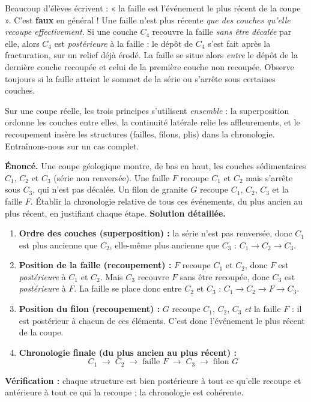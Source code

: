 \documentclass[11pt]{article}
\newcounter{popsec}
\newcounter{popsub}
\newcommand{\courssub}[1]{%
  \stepcounter{popsub}%
  \par\vspace{9pt}\noindent{\popxbold\fontsize{11.5}{13}\selectfont\color{popink}{\color{poporange}\thepopsec.\thepopsub}\hspace{6pt}#1}\par\nopagebreak\vspace{4pt}
}
\begin{document}
\begin{attention}
Beaucoup d'élèves écrivent : « la faille est l'événement le plus récent de la coupe ». C'est \textbf{faux} en général ! Une faille n'est plus récente \emph{que des couches qu'elle recoupe effectivement}. Si une couche $C_4$ recouvre la faille \emph{sans être décalée} par elle, alors $C_4$ est \emph{postérieure} à la faille : le dépôt de $C_4$ s'est fait après la fracturation, sur un relief déjà érodé. La faille se situe alors \emph{entre} le dépôt de la dernière couche recoupée et celui de la première couche non recoupée. Observe toujours si la faille atteint le sommet de la série ou s'arrête sous certaines couches.
\end{attention}

\courssub{Application combinée des trois principes}

Sur une coupe réelle, les trois principes s'utilisent \emph{ensemble} : la superposition ordonne les couches entre elles, la continuité latérale relie les affleurements, et le recoupement insère les structures (failles, filons, plis) dans la chronologie. Entraînons-nous sur un cas complet.

\begin{exoresolu}
\textbf{Énoncé.} Une coupe géologique montre, de bas en haut, les couches sédimentaires $C_1$, $C_2$ et $C_3$ (série non renversée). Une faille $F$ recoupe $C_1$ et $C_2$ mais s'arrête sous $C_3$, qui n'est pas décalée. Un filon de granite $G$ recoupe $C_1$, $C_2$, $C_3$ et la faille $F$. Établir la chronologie relative de tous ces événements, du plus ancien au plus récent, en justifiant chaque étape.
\tcblower
\textbf{Solution détaillée.}
\begin{enumerate}
\item \textbf{Ordre des couches (superposition) :} la série n'est pas renversée, donc $C_1$ est plus ancienne que $C_2$, elle-même plus ancienne que $C_3$ : $C_1 \rightarrow C_2 \rightarrow C_3$.
\item \textbf{Position de la faille (recoupement) :} $F$ recoupe $C_1$ et $C_2$, donc $F$ est \emph{postérieure} à $C_1$ et $C_2$. Mais $C_3$ recouvre $F$ sans être recoupée, donc $C_3$ est \emph{postérieure} à $F$. La faille se place donc entre $C_2$ et $C_3$ : $C_1 \rightarrow C_2 \rightarrow F \rightarrow C_3$.
\item \textbf{Position du filon (recoupement) :} $G$ recoupe $C_1$, $C_2$, $C_3$ \emph{et} la faille $F$ : il est postérieur à chacun de ces éléments. C'est donc l'événement le plus récent de la coupe.
\item \textbf{Chronologie finale (du plus ancien au plus récent) :}
\[ C_1 \;\rightarrow\; C_2 \;\rightarrow\; \text{faille } F \;\rightarrow\; C_3 \;\rightarrow\; \text{filon } G \]
\end{enumerate}
\textbf{Vérification :} chaque structure est bien postérieure à tout ce qu'elle recoupe et antérieure à tout ce qui la recoupe ; la chronologie est cohérente.
\end{exoresolu}
\end{document}
